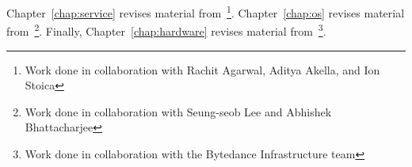 Chapter~\ref{chap:service} revises material from~\cite{jiffy}\footnote{Work done in collaboration with Rachit Agarwal, Aditya Akella, and Ion Stoica}. Chapter~\ref{chap:os} revises material from~\cite{chase}\footnote{Work done in collaboration with Seung-seob Lee and Abhishek Bhattacharjee}. Finally, Chapter~\ref{chap:hardware} revises material from~\cite{cxleurosys}\footnote{Work done in collaboration with the Bytedance Infrastructure team}.
